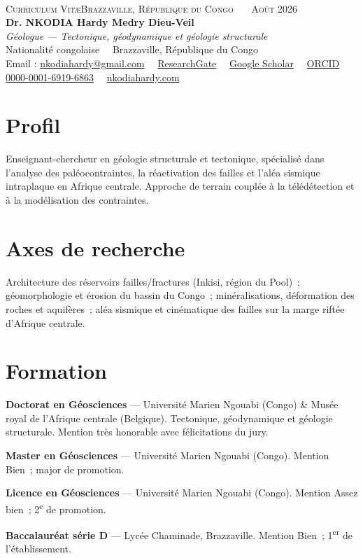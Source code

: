 \documentclass[11pt,a4paper]{article}
\newcommand{\dateb}[1]{{\small\itshape\color{grey}#1}}
\newcommand{\cvrow}[2]{%
  \noindent\makebox[2.7cm][l]{\dateb{#1}}%
  \parbox[t]{\dimexpr\linewidth-2.7cm\relax}{#2}\par\smallskip}
\begin{document}
\thispagestyle{cvfirst}

\noindent{\color{accent}\rule{\linewidth}{1.3pt}}\\[3.5pt]
{\footnotesize\scshape\color{grey} Curriculum Vit\ae\hfill Brazzaville, R\'epublique du Congo \ \textbullet\ \ Ao\^ut 2026}\\[5pt]
{\Huge\bfseries\color{accent} Dr. NKODIA Hardy Medry Dieu-Veil}\\[3pt]
{\large\itshape\color{accent2} Géologue — Tectonique, géodynamique et géologie structurale}\\[5pt]
{\small\color{grey} Nationalité congolaise \ \textbullet\ Brazzaville, République du Congo}\\[3pt]
{\small Email : \href{mailto:nkodiahardy@gmail.com}{nkodiahardy@gmail.com} \ \textbullet\ \href{https://www.researchgate.net/profile/Hardy-Medry-Dieu-Veil-Nkodia}{ResearchGate} \ \textbullet\ \href{https://scholar.google.com/citations?user=gYOI-FkAAAAJ&hl=fr}{Google Scholar} \ \textbullet\ \href{https://orcid.org/0000-0001-6919-6863}{ORCID 0000-0001-6919-6863} \ \textbullet\ \href{https://nkodiahardy.com}{nkodiahardy.com}}\\[6pt]
\noindent{\color{accent2}\rule{\linewidth}{0.5pt}}

\section{Profil}
Enseignant-chercheur en géologie structurale et tectonique, spécialisé dans l'analyse des paléocontraintes, la réactivation des failles et l'aléa sismique intraplaque en Afrique centrale. Approche de terrain couplée à la télédétection et à la modélisation des contraintes.

\section{Axes de recherche}
Architecture des réservoirs failles/fractures (Inkisi, région du Pool)~; géomorphologie et érosion du bassin du Congo~; minéralisations, déformation des roches et aquifères~; aléa sismique et cinématique des failles sur la marge riftée d'Afrique centrale.

\section{Formation}
\cvrow{2019 – 2024}{\textbf{Doctorat en Géosciences} — Université Marien Ngouabi (Congo) \& Musée royal de l'Afrique centrale (Belgique). Tectonique, géodynamique et géologie structurale. Mention très honorable avec félicitations du jury.}
\cvrow{2015 – 2017}{\textbf{Master en Géosciences} — Université Marien Ngouabi (Congo). Mention Bien~; major de promotion.}
\cvrow{2012 – 2015}{\textbf{Licence en Géosciences} — Université Marien Ngouabi (Congo). Mention Assez bien~; 2\textsuperscript{e} de promotion.}
\cvrow{2011}{\textbf{Baccalauréat série D} — Lycée Chaminade, Brazzaville. Mention Bien~; 1\textsuperscript{er} de l'établissement.}
\end{document}
